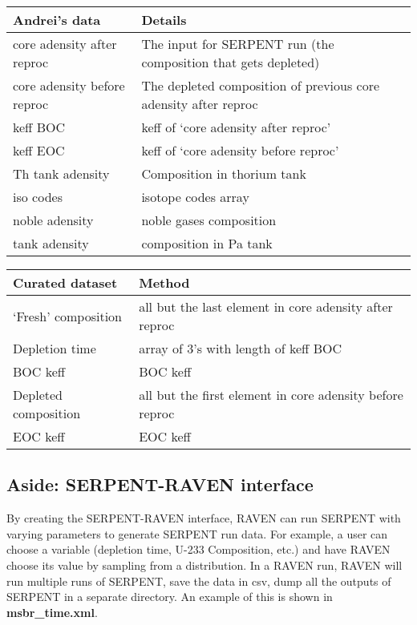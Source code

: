 \documentclass{article}
\begin{document}
\begin{table}
\begin{center}
\begin{tabular}{ l l }
    \hline
    Andrei's data & Details \\
    \hline
    core adensity after reproc & The input for SERPENT run (the composition that gets depleted) \\ 
    core adensity before reproc & The depleted composition of previous core adensity after reproc \\
    keff BOC & keff of `core adensity after reproc' \\
    keff EOC & keff of `core adensity before reproc' \\
    Th tank adensity & Composition in thorium tank \\
    iso codes & isotope codes array \\
    noble adensity & noble gases composition \\
    tank adensity & composition in Pa tank \\
    \hline
\end{tabular}
\end{center}
\label{tab:andrei}
\end{table}

\begin{table}

\begin{center}
\begin{tabular}{ l l }
    \hline
    Curated dataset & Method \\
    \hline
    `Fresh' composition & all but the last element in core adensity after reproc  \\
    Depletion time & array of 3's with length of keff BOC \\
    BOC keff & BOC keff \\
    Depleted composition & all but the first element in core adensity before reproc \\  
    EOC keff & EOC keff \\
    \hline
\end{tabular}
\label{tab:csv}
\end{center}
\end{table}


\subsection*{Aside: SERPENT-RAVEN interface}

By creating the SERPENT-RAVEN interface, RAVEN can run SERPENT
with varying parameters to generate SERPENT run data. For example,
a user can choose a variable (depletion time, U-233 Composition, etc.)
and have RAVEN choose its value by sampling from a distribution. 
In a RAVEN run, RAVEN will run multiple runs of SERPENT, save the 
data in csv, dump all the outputs of SERPENT in a separate directory.
An example of this is shown in \textbf{msbr\_time.xml}.
\end{document}
